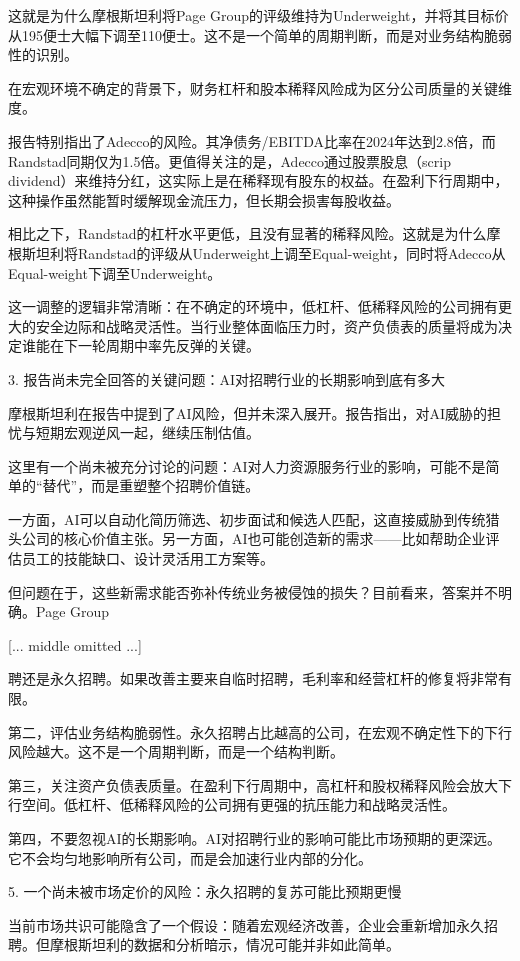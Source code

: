 \documentclass[11pt]{ctexart}
\begin{document}
这就是为什么摩根斯坦利将Page Group的评级维持为Underweight，并将其目标价从195便士大幅下调至110便士。这不是一个简单的周期判断，而是对业务结构脆弱性的识别。

在宏观环境不确定的背景下，财务杠杆和股本稀释风险成为区分公司质量的关键维度。

报告特别指出了Adecco的风险。其净债务/EBITDA比率在2024年达到2.8倍，而Randstad同期仅为1.5倍。更值得关注的是，Adecco通过股票股息（scrip dividend）来维持分红，这实际上是在稀释现有股东的权益。在盈利下行周期中，这种操作虽然能暂时缓解现金流压力，但长期会损害每股收益。

相比之下，Randstad的杠杆水平更低，且没有显著的稀释风险。这就是为什么摩根斯坦利将Randstad的评级从Underweight上调至Equal-weight，同时将Adecco从Equal-weight下调至Underweight。

这一调整的逻辑非常清晰：在不确定的环境中，低杠杆、低稀释风险的公司拥有更大的安全边际和战略灵活性。当行业整体面临压力时，资产负债表的质量将成为决定谁能在下一轮周期中率先反弹的关键。

3. 报告尚未完全回答的关键问题：AI对招聘行业的长期影响到底有多大

摩根斯坦利在报告中提到了AI风险，但并未深入展开。报告指出，对AI威胁的担忧与短期宏观逆风一起，继续压制估值。

这里有一个尚未被充分讨论的问题：AI对人力资源服务行业的影响，可能不是简单的“替代”，而是重塑整个招聘价值链。

一方面，AI可以自动化简历筛选、初步面试和候选人匹配，这直接威胁到传统猎头公司的核心价值主张。另一方面，AI也可能创造新的需求——比如帮助企业评估员工的技能缺口、设计灵活用工方案等。

但问题在于，这些新需求能否弥补传统业务被侵蚀的损失？目前看来，答案并不明确。Page Group

[... middle omitted ...]

聘还是永久招聘。如果改善主要来自临时招聘，毛利率和经营杠杆的修复将非常有限。

第二，评估业务结构脆弱性。永久招聘占比越高的公司，在宏观不确定性下的下行风险越大。这不是一个周期判断，而是一个结构判断。

第三，关注资产负债表质量。在盈利下行周期中，高杠杆和股权稀释风险会放大下行空间。低杠杆、低稀释风险的公司拥有更强的抗压能力和战略灵活性。

第四，不要忽视AI的长期影响。AI对招聘行业的影响可能比市场预期的更深远。它不会均匀地影响所有公司，而是会加速行业内部的分化。

5. 一个尚未被市场定价的风险：永久招聘的复苏可能比预期更慢

当前市场共识可能隐含了一个假设：随着宏观经济改善，企业会重新增加永久招聘。但摩根斯坦利的数据和分析暗示，情况可能并非如此简单。
\end{document}
